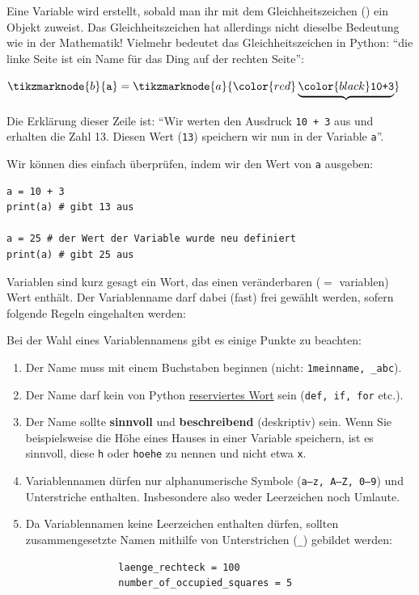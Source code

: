 Eine Variable wird erstellt, sobald man ihr mit dem Gleichheitszeichen (\pythoninline{=}) ein Objekt zuweist. Das Gleichheitszeichen hat allerdings nicht dieselbe Bedeutung wie in der Mathematik! Vielmehr bedeutet das Gleichheitszeichen in Python: \enquote{die linke Seite ist ein Name für das Ding auf der rechten Seite}:
\begin{center}
	$ \tikzmarknode{b}{\text{\texttt{a}}} =\tikzmarknode{a}{\color{red}\underbrace{\color{black}\text{\texttt{10+3}}}}$
\end{center}

Die Erklärung dieser Zeile ist: \enquote{Wir werten den Ausdruck \lstinline|10 + 3| aus und erhalten die Zahl 13. Diesen Wert (\lstinline|13|) speichern wir nun in der Variable \lstinline|a|}.

Wir können dies einfach überprüfen, indem wir den Wert von \lstinline|a| ausgeben:

\begin{lstlisting}
a = 10 + 3
print(a) # gibt 13 aus

a = 25 # der Wert der Variable wurde neu definiert
print(a) # gibt 25 aus
\end{lstlisting}

Variablen sind kurz gesagt ein Wort, das einen veränderbaren ($=$ variablen) Wert enthält. Der Variablenname darf dabei (fast) frei gewählt werden, sofern folgende Regeln eingehalten werden:

\begin{myoverview}
	Bei der Wahl eines Variablennamens gibt es einige Punkte zu beachten:
	\begin{enumerate}
		\item Der Name muss mit einem Buchstaben beginnen (nicht: \verb|1meinname, _abc|).
		\item Der Name darf kein von Python \href{https://www.programiz.com/python-programming/keyword-list}{reserviertes Wort} sein (\lstinline|def, if, for| etc.).
		\item Der Name sollte \textbf{sinnvoll} und \textbf{beschreibend} (deskriptiv) sein. Wenn Sie beispielsweise die Höhe eines Hauses in einer Variable speichern, ist es sinnvoll, diese \lstinline|h| oder \lstinline|hoehe| zu nennen und nicht etwa \lstinline|x|.
		\item Variablennamen dürfen nur alphanumerische Symbole (\texttt{a--z, A--Z, 0--9}) und Unterstriche enthalten. Insbesondere also weder Leerzeichen noch Umlaute.
		\item Da Variablennamen keine Leerzeichen enthalten dürfen, sollten zusammengesetzte Namen mithilfe von Unterstrichen (\lstinline{_}) gebildet werden:
		      \begin{lstlisting}
                laenge_rechteck = 100
                number_of_occupied_squares = 5
            \end{lstlisting}
	\end{enumerate}
\end{myoverview}

